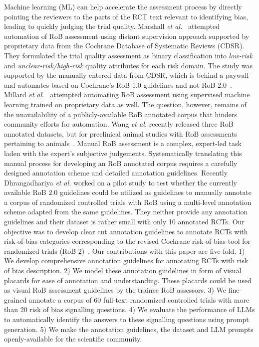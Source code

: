\documentclass[sn-mathphys,Numbered]{sn-jnl}%
\theoremstyle{thmstyleone}%
\theoremstyle{thmstyletwo}%
\theoremstyle{thmstylethree}%
\begin{document}
Machine learning (ML) can help accelerate the assessment process by directly pointing the reviewers to the parts of the RCT text relevant to identifying bias, leading to quickly judging the trial quality.
Marshall \textit{et al.}~\cite{marshall2015automating} attempted automation of RoB assessment using distant supervision approach supported by proprietary data from the Cochrane Database of Systematic Reviews (CDSR). 
They formulated the trial quality assessment as binary classification into \textit{low-risk} and \textit{unclear-risk/high-risk} quality attributes for each risk domain.
The study was supported by the manually-entered data from CDSR, which is behind a paywall and automates based on Cochrane's RoB 1.0 guidelines and not RoB 2.0~\cite{higgins2011cochrane}.
Millard \textit{et al.}~\cite{millard2016machine} attempted automating RoB assessment using supervised machine learning trained on proprietary data as well.
The question, however, remains of the unavailability of a publicly-available RoB annotated corpus that hinders community efforts for automation. 
Wang \textit{et al.} recently released three RoB annotated datasets, but for preclinical animal studies with RoB assessments pertaining to animals~\cite{wang2022risk}.
Manual RoB assessment is a complex, expert-led task laden with the expert's subjective judgements.
Systematically translating this manual process for developing an RoB annotated corpus requires a carefully designed annotation scheme and detailed annotation guidelines.
Recently Dhrangadhariya \textit{et al.} worked on a pilot study to test whether the currently available RoB 2.0 guidelines could be utilized as guidelines to manually annotate a corpus of randomized controlled trials with RoB using a multi-level annotation scheme adapted from the same guidelines.
They neither provide any annotation guidelines and their dataset is rather small with only 10 annotated RCTs.
Our objective was to develop clear cut annotation guidelines to annotate RCTs with risk-of-bias categories corresponding to the revised Cochrane risk-of-bias tool for randomized trials (RoB 2)~\cite{sterne2019rob}.
Our contributions with this paper are five-fold. 
1) We develop comprehensive annotation guidelines for annotating RCTs with risk of bias description.
2) We model these annotation guidelines in form of visual placards for ease of annotation and understanding. These placards could be used as visual RoB assessment guidelines by the trainee RoB assessors.
3) We fine-grained annotate a corpus of 60 full-text randomized controlled trials with more than 20 risk of bias signalling questions.
4) We evaluate the performance of LLMs to automatically identify the answers to these signalling questions using prompt generation.
5) We make the annotation guidelines, the dataset and LLM prompts openly-available for the scientific community.
%
%
%
\end{document}
